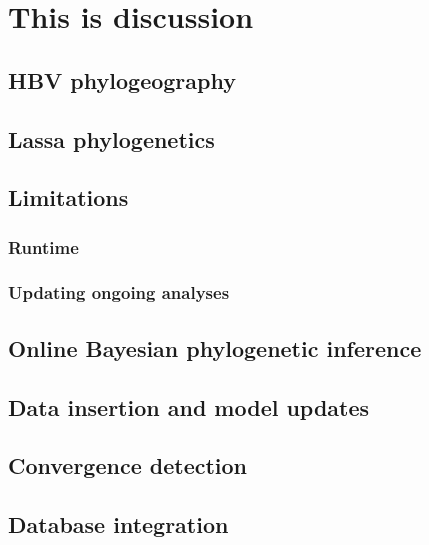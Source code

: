 \chapter{This is discussion}\label{ch:discussion}

\section{HBV phylogeography}

\section{Lassa phylogenetics}

\section{Limitations}

\subsection{Runtime}

\subsection{Updating ongoing analyses}

\section{Online Bayesian phylogenetic inference}

\section{Data insertion and model updates}

\section{Convergence detection}

\section{Database integration}






\cleardoublepage


